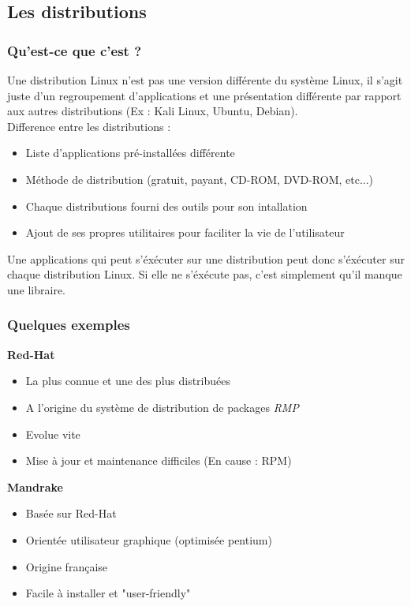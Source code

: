 \documentclass[a4paper]{article}
\begin{document}
  \subsection{Les distributions}
  \subsubsection{Qu'est-ce que c'est ?}
  Une distribution Linux n'est pas une version différente du système Linux, il s'agit juste d'un regroupement d'applications et une présentation
  différente par rapport aux autres distributions (Ex : Kali Linux, Ubuntu, Debian).\\
  
  Difference entre les distributions :
  \begin{itemize}[label=\textbullet, font=\Large]
    \item Liste d'applications pré-installées différente
    \item Méthode de distribution (gratuit, payant, CD-ROM, DVD-ROM, etc...)
    \item Chaque distributions fourni des outils pour son intallation
    \item Ajout de ses propres utilitaires pour faciliter la vie de l'utilisateur
  \end{itemize}

  Une applications qui peut s'éxécuter sur une distribution peut donc s'éxécuter sur chaque distribution Linux. 
  Si elle ne s'éxécute pas, c'est simplement qu'il manque une libraire.

  \subsubsection{Quelques exemples}
  \textbf{Red-Hat}
  \begin{itemize}[label=\textbullet, font=\Large]
    \item La plus connue et une des plus distribuées
    \item A l'origine du système de distribution de packages \emph{RMP}
    \item Evolue vite
    \item Mise à jour et maintenance difficiles (En cause : RPM)\\[0.2cm]
  \end{itemize}
  
  \textbf{Mandrake}
  \begin{itemize}[label=\textbullet, font=\Large]
    \item Basée sur Red-Hat
    \item Orientée utilisateur graphique (optimisée pentium)
    \item Origine française
    \item Facile à installer et "user-friendly"\\[0.2cm]
  \end{itemize}
\end{document}
